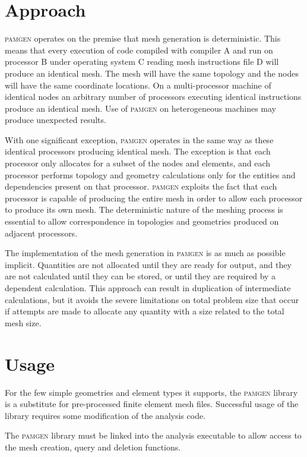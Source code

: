 \clearpage
\section{Approach}\label{sec:challenge}
\textsc{pamgen} operates on the premise that mesh generation is deterministic. This means that every execution of code compiled with compiler A and run on processor B under operating system C reading mesh instructions file D will produce an identical mesh. The mesh will have the same topology and the nodes will have the same coordinate locations.  On a multi-processor machine of identical nodes an arbitrary number of processors executing identical instructions produce an identical mesh. Use of \textsc{pamgen} on heterogeneous machines may produce unexpected results.

With one significant exception, \textsc{pamgen} operates in the same way as these identical processors producing identical mesh. The exception is that each processor only allocates for a subset of the nodes and elements, and each processor performs topology and geometry calculations only for the entities and dependencies present on that processor.  \textsc{pamgen} exploits the fact that each processor is capable of producing the entire mesh in order to allow each processor to produce its own mesh. The deterministic nature of the meshing process is essential to allow correspondence in topologies and geometries produced on adjacent processors.

The implementation of the mesh generation in \textsc{pamgen} is as much as possible implicit. Quantities are not allocated until they are ready for output, and they are not calculated until they can be stored, or until they are required by a dependent calculation. This approach can result in duplication of intermediate calculations, but it avoids the severe limitations on total problem size that occur if attempts are made to allocate any quantity with a size related to the total mesh size. 

\clearpage
\section{Usage}\label{sec:usage}
For the few simple geometries and element types it supports, the \textsc{pamgen} library is a substitute for pre-processed finite element mesh files.  Successful usage of the library requires some modification of the analysis code. 

The \textsc{pamgen} library must be linked into the analysis executable to allow access to the mesh creation, query and deletion functions.

